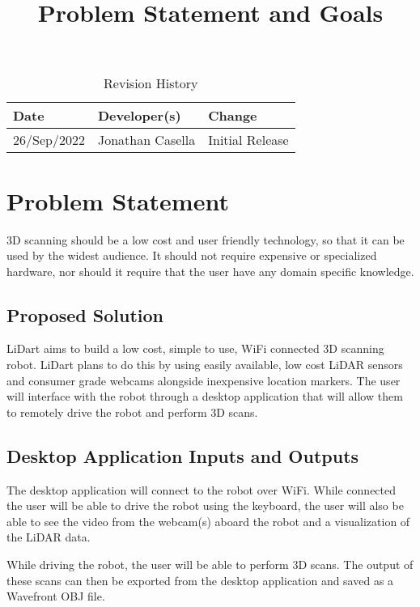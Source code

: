 \documentclass{article}
\title{Problem Statement and Goals\\\progname}
\author{\authname}
\date{}
\begin{document}
\maketitle

\begin{table}[hp]
\caption{Revision History} \label{TblRevisionHistory}
\begin{tabularx}{\textwidth}{llX}
\toprule
\textbf{Date} & \textbf{Developer(s)} & \textbf{Change}\\
\midrule
26/Sep/2022 & Jonathan Casella & Initial Release\\
\bottomrule
\end{tabularx}
\end{table}

\section{Problem Statement}

3D scanning should be a low cost and user friendly technology, so that it can be used by the widest audience.
It should not require expensive or specialized hardware, nor should it require that the user have any domain specific knowledge.

\subsection{Proposed Solution}

LiDart aims to build a low cost, simple to use, WiFi connected 3D scanning robot.
LiDart plans to do this by using easily available, low cost LiDAR sensors and consumer
grade webcams alongside inexpensive location markers.
The user will interface with the robot through a desktop application that will
allow them to remotely drive the robot and perform 3D scans.

\subsection{Desktop Application Inputs and Outputs}

The desktop application will connect to the robot over WiFi.
While connected the user will be able to drive the robot using the keyboard,
the user will also be able to see the video from the webcam(s) aboard the
robot and a visualization of the LiDAR data. 

While driving the robot, the user will be able to perform 3D scans.
The output of these scans can then be exported from the
desktop application and saved as a Wavefront OBJ file.
\end{document}
